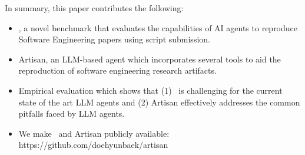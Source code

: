 In summary, this paper contributes the following:
\begin{itemize}
    \item \benchmark, a novel benchmark that evaluates the capabilities of AI agents to reproduce Software Engineering papers using script submission.
    \item Artisan, an LLM-based agent which incorporates several tools to aid the reproduction of software engineering research artifacts.
    \item Empirical evaluation which shows that (1) \benchmark~is challenging for the current state of the art LLM agents and (2) Artisan effectively addresses the common pitfalls faced by LLM agents.
    \item We make \benchmark~and Artisan publicly available: https://github.com/doehyunbaek/artisan
\end{itemize}
